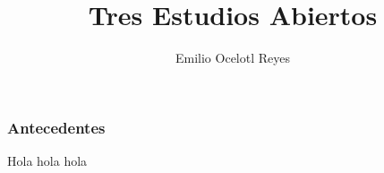 \documentclass[12pt,letterpaper]{beamer}
\title{Tres Estudios Abiertos}
\author{Emilio Ocelotl Reyes}
\institute{Posgrado en Música UNAM}
\begin{document}
\frame{\titlepage}

\begin{frame}

\frametitle{Antecedentes}

Hola hola hola

\end{frame}
\end{document}
